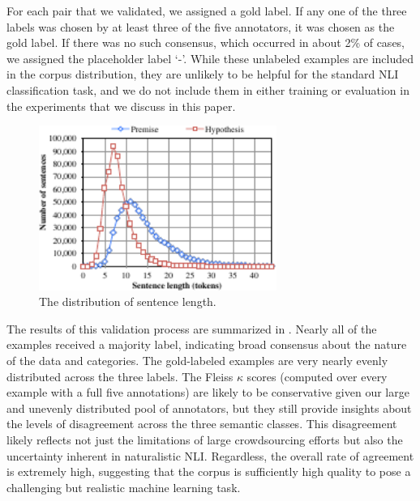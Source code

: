 For each pair that we validated, we assigned a gold label. If any one of
the three labels was chosen by at least three of the five annotators, it was 
chosen as the gold label. If there was no such consensus, which
occurred in about 2\% of cases, we assigned the placeholder label `-'. 
While these unlabeled examples are included in the corpus distribution, they are
unlikely to be helpful for the standard NLI classification task, and
we do not include them in either training or evaluation in the experiments that we 
discuss in this paper.

 
\begin{figure}
\center
\includegraphics[width=3.05in]{length_dist}
\caption{\label{length-dist}The distribution of sentence length.} 
\end{figure}
 

The results of this validation process
are summarized in . 
Nearly all of the examples received a majority
label, indicating broad consensus about the nature of the data and
categories. The gold-labeled examples are very nearly evenly
distributed across the three labels. The Fleiss $\kappa$ scores 
(computed over every example with a full five annotations)
are likely to be conservative given our large and
unevenly distributed pool of annotators, but they still provide insights
about the levels of disagreement across the three semantic
classes. This disagreement likely reflects not just the limitations of
large crowdsourcing efforts but also the uncertainty inherent in naturalistic NLI\@.
Regardless, the overall rate of agreement is extremely high,
suggesting that the corpus is sufficiently high quality to pose a
challenging but realistic machine learning task.

